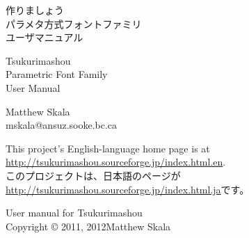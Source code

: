 \documentclass[14pt]{extarticle}
\begin{document}
\pagestyle{plain}\thispagestyle{empty}


\kaku
\begin{center}\LARGE

\vspace*{\fill}


{\Huge 作りましょう~\TsukurimashouVWide}\\
{\huge パラメタ方式フォントファミリ\\
ユーザマニュアル}

\vspace*{0.75in}

{\Huge Tsukurimashou~\TsukurimashouVersion}\\
{\huge Parametric Font Family\\
User Manual}

\vspace*{1.5in}

Matthew Skala\\
mskala@ansuz.sooke.bc.ca\\
\TsukurimashouRDWide\qquad\TsukurimashouReleaseDate

\vspace*{\fill}

\end{center}
\clearpage


\vspace*{\fill}


This project's English-language home page is at\\
\hspace*{1em}\url{http://tsukurimashou.sourceforge.jp/index.html.en}.\\
このプロジェクトは、日本語のページが\\
\hspace*{1em}\url{http://tsukurimashou.sourceforge.jp/index.html.ja}です。

\vspace*{1in}

User manual for Tsukurimashou\\
Copyright © 2011, 2012\quad Matthew Skala
\end{document}

